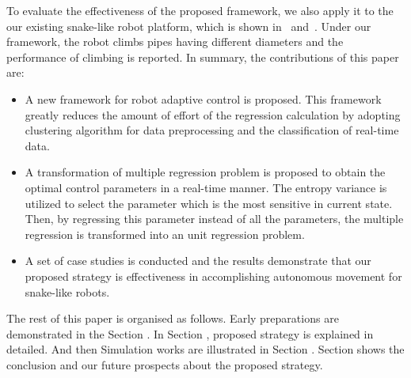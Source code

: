 To evaluate the effectiveness of the proposed framework, we also apply it to the our 
existing snake-like robot platform, which is shown in~
and~. Under our framework, the robot climbs pipes having different diameters and the
performance of climbing is reported. In summary, the contributions of this paper are:
\begin{itemize}
	\item A new framework for robot adaptive control is proposed.
 	      This framework greatly reduces the amount of  effort of the regression calculation 
           by adopting clustering algorithm for data preprocessing and the classification of 
           real-time data.
	\item A transformation of multiple regression problem is proposed to obtain the optimal
          control parameters in a real-time manner.
         The entropy variance is utilized to select the parameter which is the most sensitive 
         in current state. Then, by regressing this parameter instead of all the parameters, the 
         multiple regression is transformed into an unit regression problem.
    \item A set of case studies is conducted and the results demonstrate
    that our proposed strategy is effectiveness in accomplishing autonomous movement for snake-like robots.
\end{itemize}

The rest of this paper is organised as follows. Early preparations are demonstrated in the Section \uppercase\expandafter{}. In Section \uppercase\expandafter{}, proposed strategy is explained in detailed. And then Simulation works are illustrated in Section \uppercase\expandafter{}. Section \uppercase\expandafter{} shows the conclusion and our future prospects about the proposed strategy.

